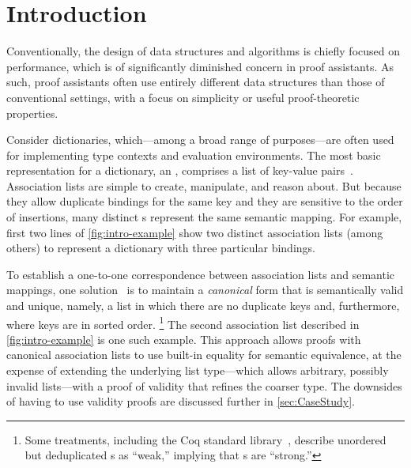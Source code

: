 \section{Introduction}
\label{sec:Introduction}


Conventionally, the design of data structures and algorithms is chiefly focused on performance, which is of significantly diminished concern in proof assistants.
%
As such, proof assistants often use entirely different data structures than those of conventional settings, with a focus on simplicity or useful proof-theoretic properties.

Consider dictionaries, which---among a broad range of purposes---are often used for implementing type contexts and evaluation environments.
%
The most basic representation for a dictionary, an \emph{\sal}, comprises a list of key-value pairs~\citep[Lists]{Pierce:SF1}.
%
Association lists are simple to create, manipulate, and reason about.
%
But because they allow duplicate bindings for the same key and they are sensitive to the order of insertions, many distinct \sal{}s represent the same semantic mapping.
%
For example, first two lines of \autoref{fig:intro-example}
%
%
show two distinct association lists (among others) to represent a dictionary with three particular bindings.



To establish a one-to-one correspondence between association lists and semantic mappings, one solution~\citep{FMapList} is to maintain a \emph{canonical}
%
form that is semantically valid and unique, namely, a list in which there are no duplicate keys and, furthermore, where keys are in sorted order.%
%
\footnote{\hspace{0.01in}%
%
Some treatments, including the Coq standard library~\citep{FMapInterface}, describe unordered but deduplicated \sal{}s as ``weak,'' implying that \cal{}s are ``strong.''
%
}
%
The second association list described in \autoref{fig:intro-example} is one such example.
%
This approach allows proofs with canonical association lists to use built-in equality for semantic equivalence, at the expense of extending the underlying list type---which allows arbitrary, possibly invalid lists---with a proof of validity that refines the coarser type. The downsides of having to use validity proofs are discussed further in \autoref{sec:CaseStudy}.

